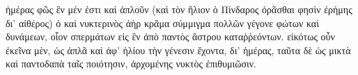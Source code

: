 \documentclass[a4paper, 11pt, oneside, polutonikogreek, german, landscape]{article}
\begin{document}
ἡμέρας φῶς ἓν μέν ἐστι καὶ ἁπλοῦν (καὶ τὸν ἥλιον ὁ Πίνδαρος ὁρᾶσθαι φησὶν ἐρήμης δι' αἰθέρος) ὁ καὶ νυκτερινὸς ἀὴρ κρᾶμα σύμμιγμα πολλῶν γέγονε φώτων καὶ δυνάμεων, οἷον σπερμάτων εἰς ἓν ἀπὸ παντὸς ἄστρου καταῤῥεόντων. εἰκότως οὖν ἐκεῖνα μὲν, ὡς ἁπλᾶ καὶ ἀφ' ἡλίου τὴν γένεσιν ἔχοντα, δι' ἡμέρας, ταῦτα δὲ ὡς μικτὰ καὶ παντοδαπὰ ταῖς ποιότησιν, ἀρχομένης νυκτὸς ἐπιθυμιῶσιν.

\clearpage
\end{document}
